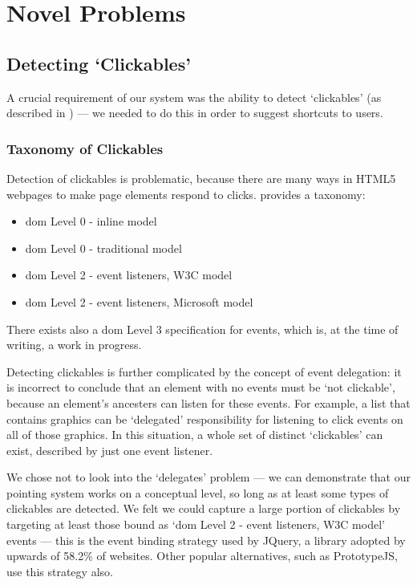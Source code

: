 \documentclass[11pt,openright,a4paper]{report}
\begin{document}
\section{Novel Problems}
\subsection{Detecting `Clickables'}
A crucial requirement of our system was the ability to detect `clickables' (as described in ) --- we needed to do this in order to suggest shortcuts to users.

\subsubsection{Taxonomy of Clickables}
Detection of clickables is problematic, because there are many ways in HTML5 webpages to make page elements respond to clicks. \citeauthor{events} provides a taxonomy\cite{events}:

\begin{itemize}
	\item \gls{dom} Level 0 - inline model\cite{inlineevents}
	\item \gls{dom} Level 0 - traditional model\cite{traditionalevents}
	\item \gls{dom} Level 2 - event listeners, W3C model\cite{domlevel2,advancedevents}
	\item \gls{dom} Level 2 - event listeners, Microsoft model
\end{itemize}

There exists also a \gls{dom} Level 3 specification for events\cite{domlevel3}, which is, at the time of writing, a work in progress.

Detecting clickables is further complicated by the concept of event delegation\cite{franklin2013more}: it is incorrect to conclude that an element with no events must be `not clickable', because an element's ancesters can listen for these events. For example, a list that contains graphics can be `delegated' responsibility for listening to click events on all of those graphics. In this situation, a whole set of distinct `clickables' can exist, described by just one event listener.

We chose not to look into the `delegates' problem --- we can demonstrate that our pointing system works on a conceptual level, so long as at least some types of clickables are detected. We felt we could capture a large portion of clickables by targeting at least those bound as `\gls{dom} Level 2 - event listeners, W3C model' events --- this is the event binding strategy used by JQuery, a library adopted by upwards of 58.2\% of websites\cite{jquerypopularity}. Other popular alternatives, such as PrototypeJS\cite{prototypejs}, use this strategy also.
\end{document}
